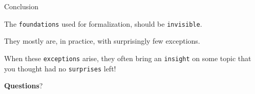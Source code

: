 \documentclass{beamer}
\begin{document}
\begin{frame}[fragile]{Conclusion}

The {\color{violet}\verb`foundations`} used for formalization, should be {\color{violet}\verb`invisible`}.

They mostly are, in practice, with surprisingly few exceptions.

When these {\color{violet}\verb`exceptions`} arise, they often bring an {\color{violet}\verb`insight`} on some topic that you thought had no {\color{violet}\verb`surprises`} left!
\bigskip
\bigskip

\LARGE\centerline{
{\textbf{Questions}}?
}
\end{frame}
\end{document}
